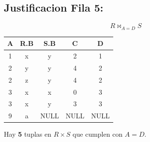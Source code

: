 \subsection*{Justificacion Fila 5:}
  \[R \bowtie_{A = D} S\]


  
\begin{center}
\begin{tabular}{|c|c|c|c|c|}
  \hline
  \textbf{A} & \textbf{R.B} & \textbf{S.B} & \textbf{C} & \textbf{D} \\ \hline
  1 & x & y & 2 & 1 \\ \hline
  2 & y & y & 4 & 2 \\ \hline
  2 & z & y & 4 & 2 \\ \hline
  3 & x & x & 0 & 3 \\ \hline
  3 & x & y & 3 & 3 \\ \hline
  9 & a & NULL & NULL & NULL \\ \hline
\end{tabular}
\end{center}

Hay\textbf{ 5 }tuplas en $ R \times S$ que cumplen con $A = D$.\\